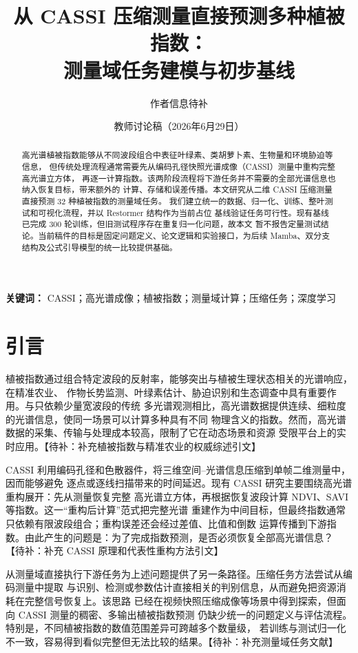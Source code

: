 \documentclass[UTF8,12pt,a4paper]{ctexart}
\title{从 CASSI 压缩测量直接预测多种植被指数：\\测量域任务建模与初步基线}
\author{作者信息待补}
\date{教师讨论稿（2026年6月29日）}
\newcommand{\todo}[1]{\textcolor{red!70!black}{【待补：#1】}}
\begin{document}
\maketitle

\begin{abstract}
高光谱植被指数能够从不同波段组合中表征叶绿素、类胡萝卜素、生物量和环境胁迫等信息，
但传统处理流程通常需要先从编码孔径快照光谱成像（CASSI）测量中重构完整高光谱立方体，
再逐一计算指数。该两阶段流程将下游任务并不需要的全部光谱信息也纳入恢复目标，带来额外的
计算、存储和误差传播。本文研究从二维 CASSI 压缩测量直接预测 32 种植被指数的测量域任务。
我们建立统一的数据、归一化、训练、整叶测试和可视化流程，并以 Restormer 结构作为当前占位
基线验证任务可行性。现有基线已完成 300 轮训练，但旧测试程序存在重复归一化问题，故本文
暂不报告定量测试结论。当前稿件的目标是固定问题定义、论文逻辑和实验接口，为后续
Mamba、双分支结构及公式引导模型的统一比较提供基础。
\end{abstract}

\noindent\textbf{关键词：} CASSI；高光谱成像；植被指数；测量域计算；压缩任务；深度学习

\section{引言}

植被指数通过组合特定波段的反射率，能够突出与植被生理状态相关的光谱响应，在精准农业、
作物长势监测、叶绿素估计、胁迫识别和生态调查中具有重要作用。与只依赖少量宽波段的传统
多光谱观测相比，高光谱数据提供连续、细粒度的光谱信息，使同一场景可以计算多种具有不同
物理含义的指数。然而，高光谱数据的采集、传输与处理成本较高，限制了它在动态场景和资源
受限平台上的实时应用。\todo{补充植被指数与精准农业的权威综述引文}

CASSI 利用编码孔径和色散器件，将三维空间--光谱信息压缩到单帧二维测量中，因而能够避免
逐点或逐线扫描带来的时间延迟。现有 CASSI 研究主要围绕高光谱重构展开：先从测量恢复完整
高光谱立方体，再根据恢复波段计算 NDVI、SAVI 等指数。这一“重构后计算”范式把完整光谱
重建作为中间目标，但最终指数通常只依赖有限波段组合；重构误差还会经过差值、比值和倒数
运算传播到下游指数。由此产生的问题是：为了完成指数预测，是否必须恢复全部高光谱信息？
\todo{补充 CASSI 原理和代表性重构方法引文}

从测量域直接执行下游任务为上述问题提供了另一条路径。压缩任务方法尝试从编码测量中提取
与识别、检测或参数估计直接相关的判别信息，从而避免把资源消耗在完整信号恢复上。该思路
已经在视频快照压缩成像等场景中得到探索，但面向 CASSI 测量的稠密、多输出植被指数预测
仍缺少统一的问题定义与评估流程。特别是，不同植被指数的数值范围差异可跨越多个数量级，
若训练与测试归一化不一致，容易得到看似完整但无法比较的结果。\todo{补充测量域任务文献}
\end{document}
